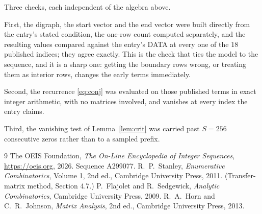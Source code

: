 \documentclass[11pt,a4paper]{article}
\theoremstyle{plain}
\theoremstyle{definition}
\begin{document}
Three checks, each independent of the algebra above.

First, the digraph, the start vector and the end vector were built directly from the
entry's stated condition, the one-row count computed separately, and the resulting values
compared against the entry's DATA at every one of the $18$ published indices; they
agree exactly. This is the check that ties the model to the sequence, and it is a sharp one:
getting the boundary rows wrong, or treating them as interior rows, changes the early terms
immediately.

Second, the recurrence \eqref{eq:conj} was evaluated on those published terms in exact
integer arithmetic, with no matrices involved, and vanishes at every index the entry claims.

Third, the vanishing test of Lemma~\ref{lem:crit} was carried past $S=256$ consecutive
zeros rather than to a sampled prefix.

\begin{thebibliography}{9}
 The OEIS Foundation, \emph{The On-Line Encyclopedia of Integer
Sequences}, \url{https://oeis.org}, 2026. Sequence A299077.
 R.~P.~Stanley, \emph{Enumerative Combinatorics}, Volume 1, 2nd ed.,
Cambridge University Press, 2011. (Transfer-matrix method, Section 4.7.)
 P.~Flajolet and R.~Sedgewick, \emph{Analytic Combinatorics}, Cambridge
University Press, 2009.
 R.~A.~Horn and C.~R.~Johnson, \emph{Matrix Analysis}, 2nd ed., Cambridge
University Press, 2013.
\end{thebibliography}
\end{document}
